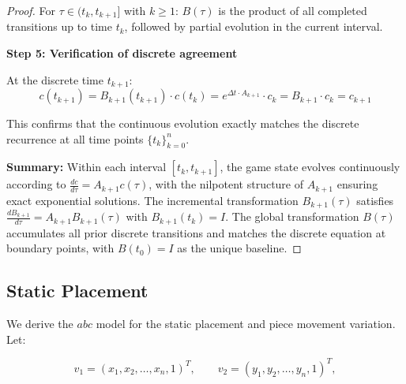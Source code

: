 \documentclass[11pt,a4paper]{article}
\theoremstyle{plain}
\theoremstyle{definition}
\begin{document}
\begin{proof}
\vspace{0.5em}

For $\tau \in (t_k, t_{k+1}]$ with $k \geq 1$: $B(\tau)$ is the product of all completed transitions up to time $t_k$, followed by partial evolution in the current interval.

\vspace{0.5em}

\textbf{Step 5: Verification of discrete agreement}

\vspace{0.5em}

At the discrete time $t_{k+1}$:
\begin{equation}
c(t_{k+1}) = B_{k+1}(t_{k+1}) \cdot c(t_k) = e^{\Delta t \cdot A_{k+1}} \cdot c_k = B_{k+1} \cdot c_k = c_{k+1}
\end{equation}

\vspace{0.5em}

This confirms that the continuous evolution exactly matches the discrete recurrence at all time points $\{t_k\}_{k=0}^n$.

\vspace{0.5em}

\textbf{Summary:} Within each interval $[t_k, t_{k+1}]$, the game state evolves continuously according to $\frac{dc}{d\tau} = A_{k+1} c(\tau)$, with the nilpotent structure of $A_{k+1}$ ensuring exact exponential solutions. The incremental transformation $B_{k+1}(\tau)$ satisfies $\frac{dB_{k+1}}{d\tau} = A_{k+1} B_{k+1}(\tau)$ with $B_{k+1}(t_k) = I$. The global transformation $B(\tau)$ accumulates all prior discrete transitions and matches the discrete equation at boundary points, with $B(t_0) = I$ as the unique baseline.
\end{proof}

\vspace{0.5em}

\subsection{Static Placement}

\vspace{0.5em}

We derive the $abc$ model for the static placement and piece movement variation. Let:

\vspace{0.5em}

\[
v_1 = (x_1, x_2, \ldots, x_n, 1)^T,\qquad
v_2 = (y_1, y_2, \ldots, y_n, 1)^T,
\]
\end{document}
